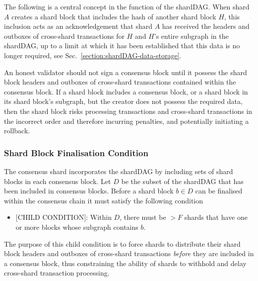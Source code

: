 The following is a central concept in the function of the shardDAG.
When shard $A$ creates a shard block that includes the hash of another shard block $H$, this inclusion acts as an acknowledgement that shard $A$ has received the headers and outboxes of cross-shard transactions for $H$ and $H$’s entire subgraph in the shardDAG, up to a limit at which it has been established that this data is no longer required, see Sec.~\ref{section:shardDAG-data-storage}.

An honest validator should not sign a consensus block until it possess the shard block headers and outboxes of cross-shard transactions contained within the consensus block.
If a shard block includes a consensus block, or a shard block in its shard block's subgraph, but the creator does not possess the required data, then the shard block risks processing transactions and cross-shard transactions in the incorrect order and therefore incurring penalties, and potentially initiating a rollback.

 
\subsubsection{Shard Block Finalisation Condition}
\label{section:shard-block-finalisation}
The consensus shard incorporates the shardDAG by including sets of shard blocks in each consensus block. 
Let $D$ be the subset of the shardDAG that has been included in consensus blocks. Before a shard block $b\in D$ can be finalised within the consensus chain it must satisfy the following condition
\begin{itemize}
	\item $[$CHILD CONDITION$]$: Within $D$, there must be $>F$ shards that have one or more blocks whose subgraph contains $b$.
\end{itemize}
The purpose of this child condition is to force shards to distribute their shard block headers and outboxes of cross-shard transactions {\it before} they are included in a consensus block, thus constraining the ability of shards to withhold and delay cross-shard transaction processing.



